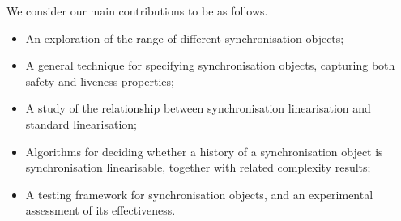 We consider our main contributions to be as follows.
%
\begin{itemize}
\item An exploration of the range of different synchronisation objects;

\item A general technique for specifying synchronisation objects, capturing
  both safety and liveness properties;

\item A study of the relationship between synchronisation linearisation and
  standard linearisation;

\item Algorithms for deciding whether a history of a synchronisation object is
  synchronisation linearisable, together with related complexity results;

\item A testing framework for synchronisation objects, and an experimental
  assessment of its effectiveness.
\end{itemize}
